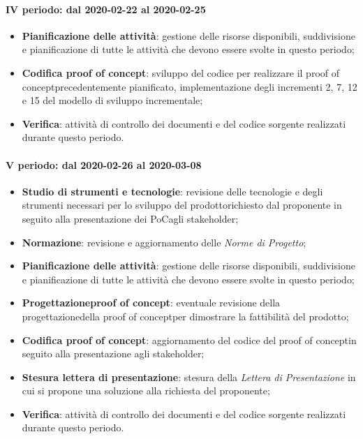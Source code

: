 \paragraph*{IV periodo: dal 2020-02-22 al 2020-02-25}
\begin{itemize}
	\item \textbf{Pianificazione delle attività}: gestione delle risorse disponibili, suddivisione e pianificazione di tutte le attività che devono essere svolte in questo periodo;
	\item \textbf{Codifica proof of concept}\glo: sviluppo del codice per realizzare il proof of concept\glosp precedentemente pianificato, implementazione degli incrementi 2, 7, 12 e 15 del modello di sviluppo incrementale;
	\item \textbf{Verifica}: attività di controllo dei documenti e del codice sorgente realizzati durante questo periodo.
\end{itemize}

\paragraph*{V periodo: dal 2020-02-26 al 2020-03-08}
\begin{itemize}
	\item \textbf{Studio di strumenti e tecnologie}: revisione delle tecnologie e degli strumenti necessari per lo sviluppo del prodotto\glosp richiesto dal proponente in seguito alla presentazione dei PoC\glosp agli stakeholder\glo;
	\item \textbf{Normazione}: revisione e aggiornamento delle \textit{Norme di Progetto};
	\item \textbf{Pianificazione delle attività}: gestione delle risorse disponibili, suddivisione e pianificazione di tutte le attività che devono essere svolte in questo periodo;
	\item \textbf{Progettazione}\glosp\textbf{proof of concept}\glo: eventuale revisione della progettazione\glosp della proof of concept\glosp per dimostrare la fattibilità del prodotto\glo;
	\item \textbf{Codifica proof of concept}\glo: aggiornamento del codice del proof of concept\glosp in seguito alla presentazione agli stakeholder\glo;
	\item \textbf{Stesura lettera di presentazione}: stesura della \textit{Lettera di Presentazione} in cui si propone una soluzione alla richiesta del proponente;
	\item \textbf{Verifica}: attività di controllo dei documenti e del codice sorgente realizzati durante questo periodo.
\end{itemize}

